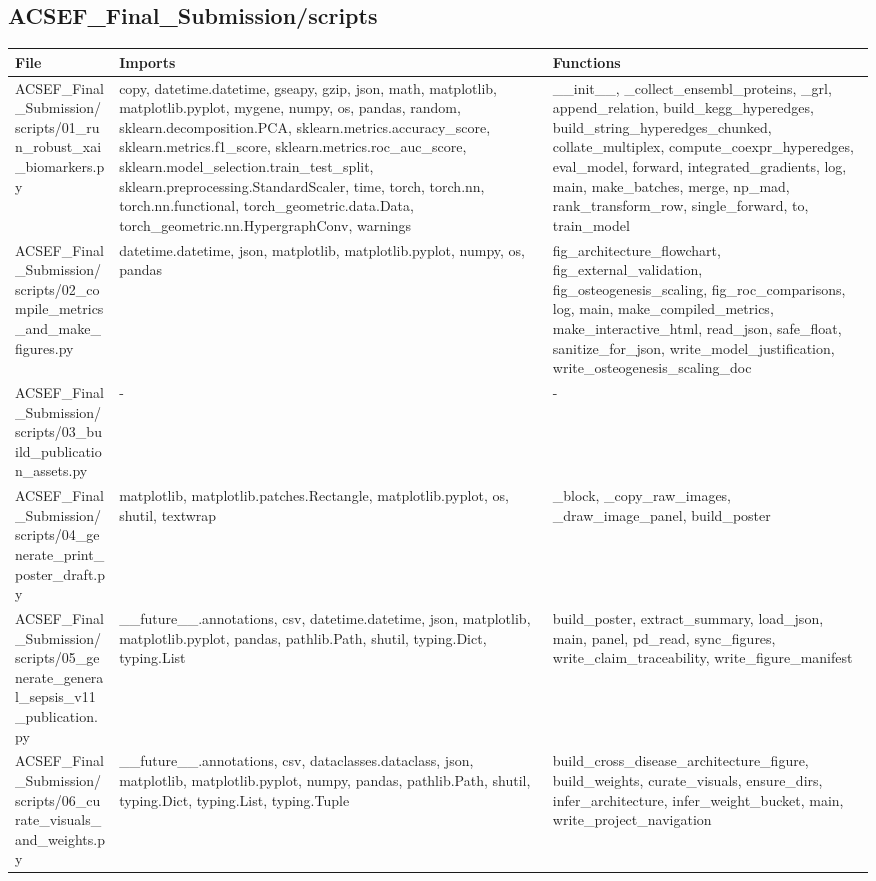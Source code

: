 \documentclass[11pt]{article}
\begin{document}
\subsection{ACSEF\_Final\_Submission/scripts}
\begin{longtable}{p{}p{}p{}}
\textbf{File} & \textbf{Imports} & \textbf{Functions} \\ \hline
ACSEF\_Final\_Submission/scripts/01\_run\_robust\_xai\_biomarkers.py & copy, datetime.datetime, gseapy, gzip, json, math, matplotlib, matplotlib.pyplot, mygene, numpy, os, pandas, random, sklearn.decomposition.PCA, sklearn.metrics.accuracy\_score, sklearn.metrics.f1\_score, sklearn.metrics.roc\_auc\_score, sklearn.model\_selection.train\_test\_split, sklearn.preprocessing.StandardScaler, time, torch, torch.nn, torch.nn.functional, torch\_geometric.data.Data, torch\_geometric.nn.HypergraphConv, warnings & \_\_init\_\_, \_collect\_ensembl\_proteins, \_grl, append\_relation, build\_kegg\_hyperedges, build\_string\_hyperedges\_chunked, collate\_multiplex, compute\_coexpr\_hyperedges, eval\_model, forward, integrated\_gradients, log, main, make\_batches, merge, np\_mad, rank\_transform\_row, single\_forward, to, train\_model \\
ACSEF\_Final\_Submission/scripts/02\_compile\_metrics\_and\_make\_figures.py & datetime.datetime, json, matplotlib, matplotlib.pyplot, numpy, os, pandas & fig\_architecture\_flowchart, fig\_external\_validation, fig\_osteogenesis\_scaling, fig\_roc\_comparisons, log, main, make\_compiled\_metrics, make\_interactive\_html, read\_json, safe\_float, sanitize\_for\_json, write\_model\_justification, write\_osteogenesis\_scaling\_doc \\
ACSEF\_Final\_Submission/scripts/03\_build\_publication\_assets.py & - & - \\
ACSEF\_Final\_Submission/scripts/04\_generate\_print\_poster\_draft.py & matplotlib, matplotlib.patches.Rectangle, matplotlib.pyplot, os, shutil, textwrap & \_block, \_copy\_raw\_images, \_draw\_image\_panel, build\_poster \\
ACSEF\_Final\_Submission/scripts/05\_generate\_general\_sepsis\_v11\_publication.py & \_\_future\_\_.annotations, csv, datetime.datetime, json, matplotlib, matplotlib.pyplot, pandas, pathlib.Path, shutil, typing.Dict, typing.List & build\_poster, extract\_summary, load\_json, main, panel, pd\_read, sync\_figures, write\_claim\_traceability, write\_figure\_manifest \\
ACSEF\_Final\_Submission/scripts/06\_curate\_visuals\_and\_weights.py & \_\_future\_\_.annotations, csv, dataclasses.dataclass, json, matplotlib, matplotlib.pyplot, numpy, pandas, pathlib.Path, shutil, typing.Dict, typing.List, typing.Tuple & build\_cross\_disease\_architecture\_figure, build\_weights, curate\_visuals, ensure\_dirs, infer\_architecture, infer\_weight\_bucket, main, write\_project\_navigation \\
\end{longtable}
\end{document}
